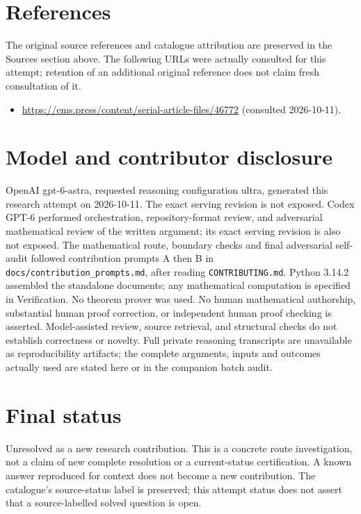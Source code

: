 \documentclass[11pt]{article}
\begin{document}
\section{References}
The original source references and catalogue attribution are preserved in the
Sources section above. The following URLs were actually consulted for this attempt;
retention of an additional original reference does not claim fresh consultation of it.
\begin{itemize}
\item \url{https://ems.press/content/serial-article-files/46772} (consulted 2026-10-11). 
\end{itemize}
\section{Model and contributor disclosure}
OpenAI gpt-6-astra, requested reasoning configuration ultra, generated this research
attempt on 2026-10-11. The exact serving revision is not exposed. Codex GPT-6
performed orchestration, repository-format review, and adversarial mathematical review of the written argument; its exact serving revision
is also not exposed. The mathematical route, boundary checks and final adversarial
self-audit followed contribution prompts A then B in
\texttt{docs/contribution\_prompts.md}, after reading \texttt{CONTRIBUTING.md}.
Python 3.14.2 assembled the standalone documents; any mathematical computation is
specified in Verification. No theorem prover was used. No human mathematical
authorship, substantial human proof correction, or independent human proof checking
is asserted. Model-assisted review, source retrieval, and structural checks do not
establish correctness or novelty. Full private reasoning transcripts are unavailable
as reproducibility artifacts; the complete arguments, inputs and outcomes actually
used are stated here or in the companion batch audit.
\section{Final status}
Unresolved as a new research contribution. This is a concrete route investigation,
not a claim of new complete resolution or a current-status certification. A known
answer reproduced for context does not become a new contribution. The catalogue's
source-status label is preserved; this attempt status does not assert that a
source-labelled solved question is open.
\end{document}
